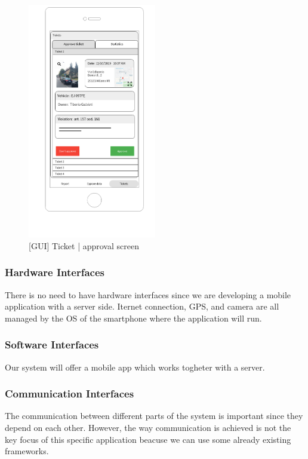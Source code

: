 \begin{figure}[H]
		\centering
      \includegraphics[width=0.5\textwidth]{GUI/ticketapp.png}
      \caption{[GUI] Ticket | approval screen}   \label{fig:ticket}
\end{figure}

\subsubsection{Hardware Interfaces}
There is no need to have hardware interfaces since we are developing a mobile application with a server side.
Iternet connection, GPS, and camera are all managed by the OS of the smartphone where the application will run.
\subsubsection{Software Interfaces}
Our system will offer a mobile app which works togheter with a server.

\subsubsection{Communication Interfaces}
The communication between different parts of the system is important since they depend on each other. However, the way communication is achieved is not the key focus of this specific application beacuse we can use some already existing frameworks.

